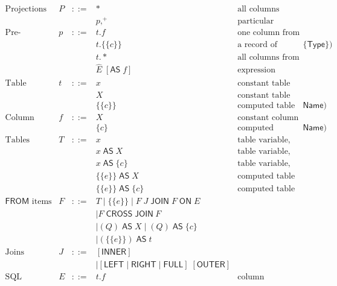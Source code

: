 \documentclass{article}
\newcommand{\mt}[1]{\mathsf{#1}}
\begin{document}
$$\begin{array}{rrcll}
  \textrm{Projections} & P &::=& \ast & \textrm{all columns} \\
  &&& p,^+ & \textrm{particular columns} \\
  \textrm{Pre-projections} & p &::=& t.f & \textrm{one column from a table} \\
  &&& t.\{\{c\}\} & \textrm{a record of columns from a table (of kind $\{\mt{Type}\}$)} \\
  &&& t.* & \textrm{all columns from a table} \\
  &&& \hat{E} \; [\mt{AS} \; f] & \textrm{expression column} \\
  \textrm{Table names} & t &::=& x & \textrm{constant table name (automatically capitalized)} \\
  &&& X & \textrm{constant table name} \\
  &&& \{\{c\}\} & \textrm{computed table name (of kind $\mt{Name}$)} \\
  \textrm{Column names} & f &::=& X & \textrm{constant column name} \\
  &&& \{c\} & \textrm{computed column name (of kind $\mt{Name}$)} \\
  \textrm{Tables} & T &::=& x & \textrm{table variable, named locally by its own capitalization} \\
  &&& x \; \mt{AS} \; X & \textrm{table variable, with local name} \\
  &&& x \; \mt{AS} \; \{c\} & \textrm{table variable, with computed local name} \\
  &&& \{\{e\}\} \; \mt{AS} \; X & \textrm{computed table expression, with local name} \\
  &&& \{\{e\}\} \; \mt{AS} \; \{c\} & \textrm{computed table expression, with computed local name} \\
  \textrm{$\mt{FROM}$ items} & F &::=& T \mid \{\{e\}\} \mid F \; J \; \mt{JOIN} \; F \; \mt{ON} \; E \\
  &&& \mid F \; \mt{CROSS} \; \mt{JOIN} \ F \\
  &&& \mid (Q) \; \mt{AS} \; X \mid (Q) \; \mt{AS} \; \{c\} \\
  &&& \mid (\{\{e\}\}) \; \mt{AS} \; t \\
  \textrm{Joins} & J &::=& [\mt{INNER}] \\
  &&& \mid [\mt{LEFT} \mid \mt{RIGHT} \mid \mt{FULL}] \; [\mt{OUTER}] \\
  \textrm{SQL expressions} & E &::=& t.f & \textrm{column references} \\

\end{array}$$
\end{document}
